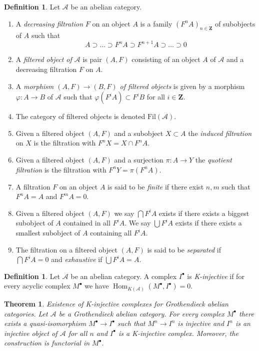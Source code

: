 \documentclass{amsart}
\newenvironment{slogan}{\comment}{\endcomment}
\theoremstyle{plain}
\newtheorem{theorem}[subsection]{Theorem}
\theoremstyle{definition}
\newtheorem{definition}[subsection]{Definition}
\theoremstyle{remark}
\numberwithin{equation}{subsection}
\def\Hom{\mathop{\mathrm{Hom}}\nolimits}
\begin{document}
\begin{definition}
\label{homology-definition-filtered}
Let $\mathcal{A}$ be an abelian category.
\begin{enumerate}
\item A {\it decreasing filtration} $F$ on an object $A$
is a family $(F^nA)_{n \in \mathbf{Z}}$ of subobjects of $A$ such that
$$
A \supset \ldots \supset F^nA \supset F^{n + 1}A \supset \ldots \supset 0
$$
\item A {\it filtered object of $\mathcal{A}$} is
pair $(A, F)$ consisting of an object $A$ of $\mathcal{A}$
and a decreasing filtration $F$ on $A$.
\item A {\it morphism $(A, F) \to (B, F)$ of filtered objects}
is given by a morphism $\varphi : A \to B$ of $\mathcal{A}$
such that $\varphi(F^iA) \subset F^iB$ for all $i \in \mathbf{Z}$.
\item The category of filtered objects is denoted $\text{Fil}(\mathcal{A})$.
\item Given a filtered object $(A, F)$ and a subobject $X \subset A$ the
{\it induced filtration} on $X$ is the filtration with $F^nX = X \cap F^nA$.
\item Given a filtered object $(A, F)$ and a surjection
$\pi : A \to Y$ the {\it quotient filtration} is the filtration with
$F^nY = \pi(F^nA)$.
\item A filtration $F$ on an object $A$ is said to be {\it finite}
if there exist $n, m$ such that $F^nA = A$ and $F^mA = 0$.
\item Given a filtered object $(A, F)$ we say $\bigcap F^iA$ exists
if there exists a biggest subobject of $A$ contained in all $F^iA$.
We say $\bigcup F^iA$ exists if there exists a smallest subobject
of $A$ containing all $F^iA$.
\item The filtration on a filtered object $(A, F)$ is said to be
{\it separated} if $\bigcap F^iA = 0$ and
{\it exhaustive} if $\bigcup F^iA = A$.
\end{enumerate}
\end{definition}

\begin{definition}
\label{derived-definition-K-injective}
Let $\mathcal{A}$ be an abelian category. A complex $I^\bullet$
is {\it K-injective} if for every acyclic complex $M^\bullet$ we
have $\Hom_{K(\mathcal{A})}(M^\bullet, I^\bullet) = 0$.
\end{definition}

\begin{theorem}
\label{theorem-K-injective-embedding-grothendieck}
\begin{slogan}
Existence of K-injective complexes for Grothendieck abelian categories.
\end{slogan}
Let $\mathcal{A}$ be a Grothendieck abelian category.
For every complex $M^\bullet$ there exists a quasi-isomorphism
$M^\bullet \to I^\bullet$ such that $M^n \to I^n$ is injective and $I^n$
is an injective object of $\mathcal{A}$ for all $n$ and $I^\bullet$
is a K-injective complex. Moreover, the construction is functorial in
$M^\bullet$.
\end{theorem}
\end{document}
